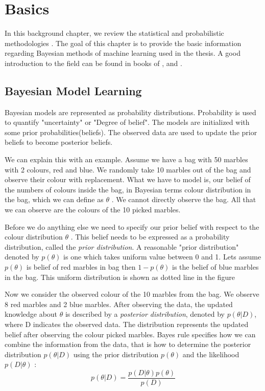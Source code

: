 

\chapter{Basics}

In this background chapter, we review the statistical and probabilistic methodologies .
The goal of this chapter is to provide the basic information regarding Bayesian methods of machine learning used in the thesis. A good introduction to the field can be found in books of \cite{bishop2007pattern}, \cite{kruschke2014doing} and \cite{lee2014bayesian} . 

\section{Bayesian Model Learning}

Bayesian models are represented as probability distributions. Probability is used to quantify "uncertainty" or "Degree of belief". The models are initialized with some prior probabilities(beliefs). The observed data are used to update the prior beliefs to become posterior beliefs.

We can explain this with an example. Assume we have a bag with 50 marbles with 2 colours, red and blue. We randomly take 10 marbles out of the bag and observe their colour with replacement. What we have to model is, our belief of the numbers of colours inside the bag, in Bayesian  terms colour distribution in the bag, which we can define as $\theta$ . We cannot directly observe the bag. All that we can observe are the colours of the 10 picked marbles.

Before we do anything else we need to specify our prior belief with respect to the colour distribution $\theta$ . This belief needs to be expressed as a probability distribution, called the \emph{prior distribution}. A reasonable "prior distribution" denoted by $p(\theta)$ is one which takes uniform value between 0 and 1. Lets assume $p(\theta)$ is belief of red marbles in bag then $1 - p(\theta)$  is the belief of blue marbles in the bag. This uniform distribution is shown as dotted line in the figure 

Now we consider the observed colour of the 10 marbles from the bag. We observe 8 red marbles and 2 blue marbles. After observing the data, the updated knowledge about $\theta$ is described by a \emph{posterior distribution}, denoted by $p(\theta | D)$, where D indicates the observed data. The distribution represents the updated belief after observing the colour picked marbles. Bayes rule specifies how we can combine the information from the data, that is how to determine the posterior distribution $p (\theta | D)$ using  the prior distribution $p(\theta)$ and the likelihood  $p (D | \theta)$ :
\begin{equation}
	p(\theta | D) = \frac{p(D | \theta) p(\theta)}{p(D)}
\end{equation}

